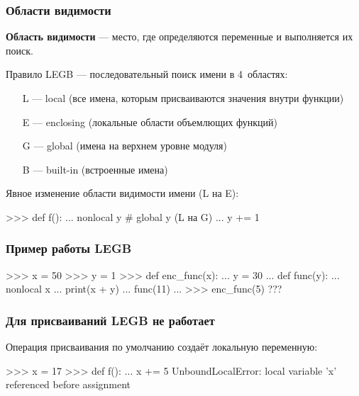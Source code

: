 \documentclass[fleqn, xcolor=x11names, 11pt]{beamer}
\begin{document}
\begin{frame}[fragile]\frametitle{Области видимости}
\hfill

\textbf{Область видимости} --- место, где определяются переменные и выполняется их поиск. 

\hfill

Правило LEGB --- последовательный поиск имени в 4~областях:
\begin{enumerate}
\item[L] --- local (все имена, которым присваиваются значения внутри функции)

\item[E] --- enclosing (локальные области объемлющих функций) 

\item[G] --- global (имена на верхнем уровне модуля)

\item[B] --- built-in (встроенные имена)
\end{enumerate}

\hfill

Явное изменение области видимости имени (L на E):
\begin{pcode}
>>> def f():
... nonlocal y     # global y (L на G)
... y += 1
\end{pcode}

\hfill

\end{frame}

\begin{frame}[fragile]\frametitle{Пример работы LEGB}
\begin{pcode}
>>> x = 50
>>> y = 1
>>> def enc_func(x):
...    y = 30
...    def func(y):
...        nonlocal x
...        print(x + y)
...    func(11)
...
>>> enc_func(5)
???
\end{pcode}
\end{frame}

\begin{frame}[fragile]\frametitle{Для присваиваний LEGB не работает}
Операция присваивания по умолчанию создаёт локальную переменную:

\begin{pcode}
>>> x = 17
>>> def f():
...    x += 5
UnboundLocalError: local variable 'x' referenced before
assignment
\end{pcode}
\end{frame}
\end{document}

